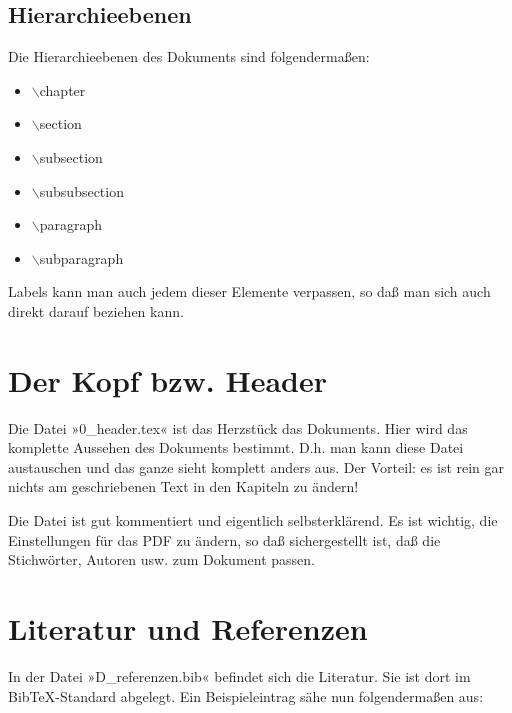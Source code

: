     \subsection{Hierarchieebenen}

    Die Hierarchieebenen des Dokuments sind folgendermaßen:
    
    \begin{itemize}
      \item $\backslash$chapter
      \item $\backslash$section 
      \item $\backslash$subsection 
      \item $\backslash$subsubsection 
      \item $\backslash$paragraph
      \item $\backslash$subparagraph
    \end{itemize}

    Labels kann man auch jedem dieser Elemente verpassen, so daß man sich auch direkt darauf beziehen kann.   


  \section{Der Kopf bzw. Header}
  \label{aufbauheader}

  Die Datei »0\_header.tex« ist das Herzstück das Dokuments. Hier wird das komplette Aussehen des Dokuments bestimmt. D.h. man kann diese Datei austauschen und das ganze sieht komplett anders aus. Der Vorteil: es ist rein gar nichts am geschriebenen Text in den Kapiteln zu ändern!
  
  Die Datei ist gut kommentiert und eigentlich selbsterklärend. Es ist wichtig, die Einstellungen für das PDF zu ändern, so daß sichergestellt ist, daß die Stichwörter, Autoren usw. zum Dokument passen.


  \section{Literatur und Referenzen}

  In der Datei »D\_referenzen.bib« befindet sich die Literatur. Sie ist dort im BibTeX-Standard abgelegt. Ein Beispieleintrag sähe nun folgendermaßen aus:
  


